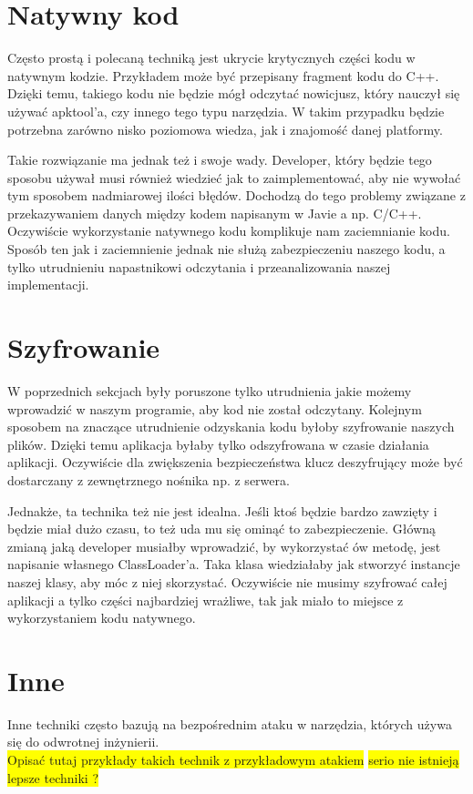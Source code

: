 \documentclass[12pt,a4paper,leqno,oneside,titlepage]{book}
\newcommand{\todo}[1]{\colorbox{yellow}{#1}}
\begin{document}
\section{Natywny kod}
Często prostą i polecaną techniką jest ukrycie krytycznych części kodu w natywnym kodzie. Przykładem może być przepisany fragment kodu do C++. Dzięki temu, takiego kodu nie będzie mógł odczytać nowicjusz, który nauczył się używać apktool'a, czy innego tego typu narzędzia. W takim przypadku będzie potrzebna zarówno nisko poziomowa wiedza, jak i znajomość danej platformy.\par
Takie rozwiązanie ma jednak też i swoje wady. Developer, który będzie tego sposobu używał musi również wiedzieć jak to zaimplementować, aby nie wywołać tym sposobem nadmiarowej ilości błędów. Dochodzą do tego problemy związane z przekazywaniem danych między kodem napisanym w Javie a np. C/C++. Oczywiście wykorzystanie natywnego kodu komplikuje nam zaciemnianie kodu. Sposób ten jak i zaciemnienie jednak nie służą zabezpieczeniu naszego kodu, a tylko utrudnieniu napastnikowi odczytania i przeanalizowania naszej implementacji.
\section{Szyfrowanie}
W poprzednich sekcjach były poruszone tylko utrudnienia jakie możemy wprowadzić w naszym programie, aby kod nie został odczytany. Kolejnym sposobem na znaczące utrudnienie odzyskania kodu byłoby szyfrowanie naszych plików. Dzięki temu aplikacja byłaby tylko odszyfrowana w czasie działania aplikacji. Oczywiście dla zwiększenia bezpieczeństwa klucz deszyfrujący może być dostarczany z zewnętrznego nośnika np. z serwera.
\par
Jednakże, ta technika też nie jest idealna. Jeśli ktoś będzie bardzo zawzięty i będzie miał dużo czasu, to też uda mu się ominąć to zabezpieczenie. Główną zmianą jaką developer musiałby wprowadzić, by wykorzystać ów metodę, jest napisanie własnego ClassLoader'a. Taka klasa wiedziałaby jak stworzyć instancje naszej klasy, aby móc z niej skorzystać. Oczywiście nie musimy szyfrować całej aplikacji a tylko części najbardziej wrażliwe, tak jak miało to miejsce z wykorzystaniem kodu natywnego.
%
\section{Inne}
Inne techniki często bazują na bezpośrednim ataku w narzędzia, których używa się do odwrotnej inżynierii.
\\
\todo{Opisać tutaj przykłady takich technik z przykładowym atakiem}
\todo{serio nie istnieją lepsze techniki ?}
%
\end{document}
